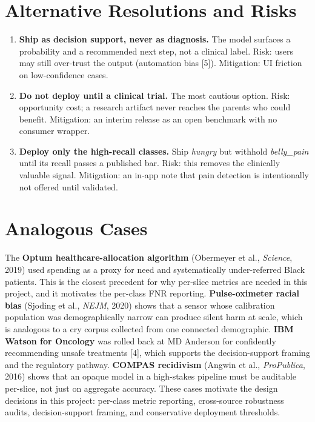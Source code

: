 \documentclass[11pt]{article}
\begin{document}
\section*{Alternative Resolutions and Risks}
\begin{enumerate}[leftmargin=*,itemsep=1pt,topsep=1pt]
    \item \textbf{Ship as decision support, never as diagnosis.} The model surfaces a probability and a recommended next step, not a clinical label. Risk: users may still over-trust the output (automation bias [5]). Mitigation: UI friction on low-confidence cases.
    \item \textbf{Do not deploy until a clinical trial.} The most cautious option. Risk: opportunity cost; a research artifact never reaches the parents who could benefit. Mitigation: an interim release as an open benchmark with no consumer wrapper.
    \item \textbf{Deploy only the high-recall classes.} Ship \textit{hungry} but withhold \textit{belly\_pain} until its recall passes a published bar. Risk: this removes the clinically valuable signal. Mitigation: an in-app note that pain detection is intentionally not offered until validated.
\end{enumerate}

\section*{Analogous Cases}
The \textbf{Optum healthcare-allocation algorithm} (Obermeyer et al., \textit{Science}, 2019) used spending as a proxy for need and systematically under-referred Black patients. This is the closest precedent for why per-slice metrics are needed in this project, and it motivates the per-class FNR reporting. \textbf{Pulse-oximeter racial bias} (Sjoding et al., \textit{NEJM}, 2020) shows that a sensor whose calibration population was demographically narrow can produce silent harm at scale, which is analogous to a cry corpus collected from one connected demographic. \textbf{IBM Watson for Oncology} was rolled back at MD Anderson for confidently recommending unsafe treatments [4], which supports the decision-support framing and the regulatory pathway. \textbf{COMPAS recidivism} (Angwin et al., \textit{ProPublica}, 2016) shows that an opaque model in a high-stakes pipeline must be auditable per-slice, not just on aggregate accuracy. These cases motivate the design decisions in this project: per-class metric reporting, cross-source robustness audits, decision-support framing, and conservative deployment thresholds.
\end{document}
